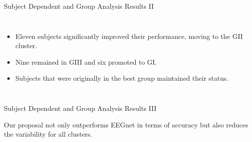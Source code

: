 \documentclass[aspectratio=169]{beamer}
\begin{document}
\begin{frame}{Subject Dependent and Group Analysis Results II}    
    \begin{columns}
        \begin{itemize}
            \item Eleven subjects significantly improved their performance, moving to the GII cluster.
            \item Nine remained in GIII and six promoted to GI.
            \item Subjects that were originally in the best group maintained their status.
        \end{itemize}
            \centering
            \resizebox{1\linewidth}{!}{}

    \end{columns}
\end{frame}

\begin{frame}{Subject Dependent and Group Analysis Results III}
    \centering
    \begin{table}[h!] 
    \end{table} 
    \vspace{2em}
    Our proposal not only outperforms EEGnet in terms of accuracy but also reduces the variability for all clusters.
\end{frame}
\end{document}
